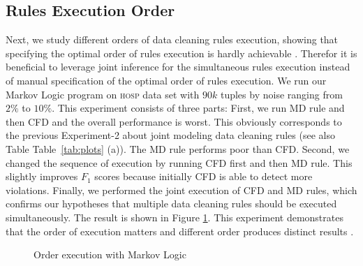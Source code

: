 \subsection{Rules Execution Order}
Next, we study different orders of data cleaning rules execution, showing that specifying the optimal order of rules execution is hardly achievable \cite{Dallachiesa:2013:NCD:2463676.2465327}. Therefor it is beneficial to leverage joint inference for the simultaneous rules execution instead of manual specification of the optimal order of rules execution. We run our Markov Logic program on \textsc{hosp} data set with $90k$ tuples by noise ranging from $2\%$ to $10\%$. This experiment consists of three parts: First, we run MD rule and then CFD and the overall performance is worst. This obviously corresponds to the previous Experiment-2 about joint modeling data cleaning rules (see also Table Table~\ref{tab:plots} (a)). The MD rule performs poor than CFD. Second, we changed the sequence of execution by running CFD first and then MD rule. This slightly improves $F_1$ scores because initially CFD is able to detect more violations. Finally, we performed the joint execution of CFD and MD rules, which confirms our hypotheses that multiple data cleaning rules should be executed simultaneously. The result is shown in Figure \ref{fig:orderexec}.  This experiment demonstrates that the order of execution matters and different order produces distinct results .


\begin{figure}
\centering
{}
\caption{Order execution with Markov Logic} 
\label{fig:orderexec}
\end{figure}


